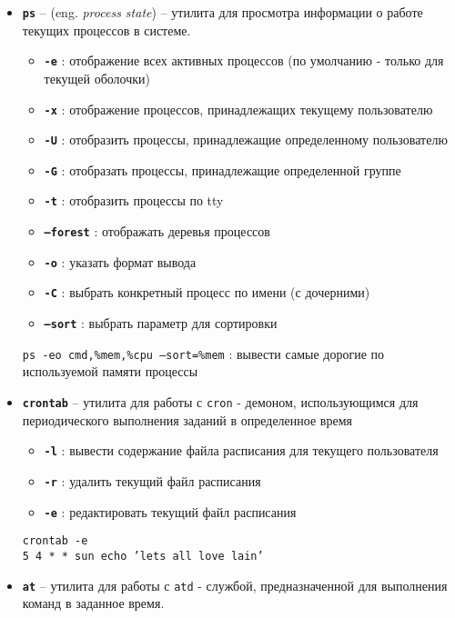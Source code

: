 \documentclass[12pt, a4paper]{article}
\begin{document}
\begin{itemize}
  \item \textbf{\texttt{ps}} -- (eng. \textit{process state}) -- утилита для просмотра
    информации о работе текущих процессов в системе.
    \begin{itemize}
      \item \textbf{\texttt{-e}} : отображение всех активных процессов (по
        умолчанию - только для текущей оболочки)
      \item \textbf{\texttt{-x}} : отображение процессов, принадлежащих текущему
        пользователю
      \item \textbf{\texttt{-U}} : отобразить процессы, принадлежащие определенному
        пользователю
      \item \textbf{\texttt{-G}} : отобразать процессы, принадлежащие определенной
        группе
      \item \textbf{\texttt{-t}} : отобразить процессы по tty
      \item \textbf{\texttt{--forest}} : отображать деревья процессов
      \item \textbf{\texttt{-o}} : указать формат вывода
      \item \textbf{\texttt{-C}} : выбрать конкретный процесс по имени (с дочерними)
      \item \textbf{\texttt{--sort}} : выбрать параметр для сортировки
    \end{itemize}
    \texttt{ps -eo cmd,\%mem,\%cpu --sort=\%mem} : вывести самые дорогие
    по используемой памяти процессы
  \item \textbf{\texttt{crontab}} -- утилита для работы с \texttt{cron} - демоном,
    использующимся для периодического выполнения заданий в определенное время
    \begin{itemize}
      \item {\textbf{\texttt{-l}}} : вывести содержание файла расписания для
        текущего пользователя
      \item {\textbf{\texttt{-r}}} : удалить текущий файл расписания
      \item {\textbf{\texttt{-e}}} : редактировать текущий файл расписания
    \end{itemize}
    \texttt{crontab -e\\5 4 * * sun echo 'lets all love lain'}
  \item \textbf{\texttt{at}} -- утилита для работы с \texttt{atd} - службой,
    предназначенной для выполнения команд в заданное время.
    \begin{itemize}

\end{itemize}
\end{itemize}
\end{document}
